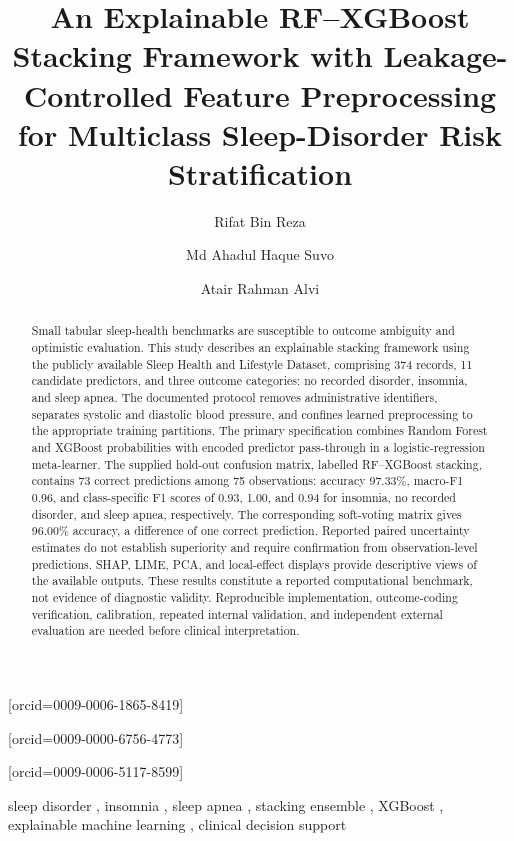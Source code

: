 \documentclass[a4paper,fleqn]{cas-dc}
\begin{document}
\raggedbottom
{}
\title[mode=title]{An Explainable RF--XGBoost Stacking Framework with Leakage-Controlled Feature Preprocessing for Multiclass Sleep-Disorder Risk Stratification}
\author[1]{Rifat Bin Reza}[orcid=0009-0006-1865-8419]
\cormark[1]
\author[2]{Md Ahadul Haque Suvo}[orcid=0009-0000-6756-4773]
\author[1]{Atair Rahman Alvi}[orcid=0009-0006-5117-8599]
\address[1]{BSRM School of Engineering, Department of Electrical and Electronics Engineering, Brac University, Dhaka, Bangladesh\label{affa}}
\address[2]{Aviation and Aerospace University, Department of Avionics Engineering, Dhaka, Bangladesh}
\begin{abstract}
Small tabular sleep-health benchmarks are susceptible to outcome ambiguity and optimistic evaluation. This study describes an explainable stacking framework using the publicly available Sleep Health and Lifestyle Dataset, comprising 374 records, 11 candidate predictors, and three outcome categories: no recorded disorder, insomnia, and sleep apnea. The documented protocol removes administrative identifiers, separates systolic and diastolic blood pressure, and confines learned preprocessing to the appropriate training partitions. The primary specification combines Random Forest and XGBoost probabilities with encoded predictor pass-through in a logistic-regression meta-learner. The supplied hold-out confusion matrix, labelled RF--XGBoost stacking, contains 73 correct predictions among 75 observations: accuracy 97.33\%, macro-F1 0.96, and class-specific F1 scores of 0.93, 1.00, and 0.94 for insomnia, no recorded disorder, and sleep apnea, respectively. The corresponding soft-voting matrix gives 96.00\% accuracy, a difference of one correct prediction. Reported paired uncertainty estimates do not establish superiority and require confirmation from observation-level predictions. SHAP, LIME, PCA, and local-effect displays provide descriptive views of the available outputs. These results constitute a reported computational benchmark, not evidence of diagnostic validity. Reproducible implementation, outcome-coding verification, calibration, repeated internal validation, and independent external evaluation are needed before clinical interpretation.
\end{abstract}
\begin{keywords}
sleep disorder \sep
insomnia \sep
sleep apnea \sep
stacking ensemble \sep
XGBoost \sep
explainable machine learning \sep
clinical decision support
\end{keywords}
\end{document}
